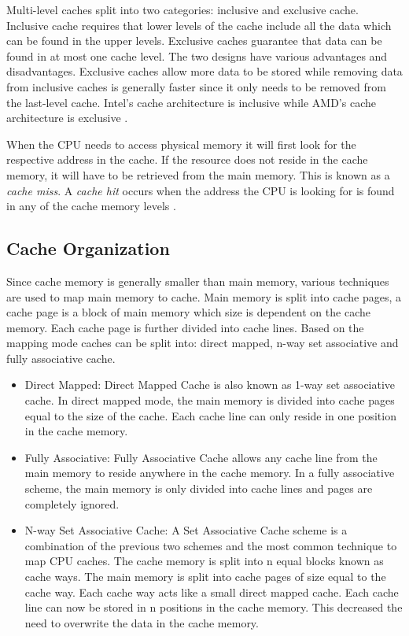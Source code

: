 \documentclass[10pt,a4paper,twoside]{book}
\begin{document}
Multi-level caches split into two categories: inclusive and exclusive cache. Inclusive cache requires that lower levels of the cache include all the data which can be found in the upper levels. Exclusive caches guarantee that data can be found in at most one cache level. The two designs have various advantages and disadvantages. Exclusive caches allow more data to be stored while removing data from inclusive caches is generally faster since it only needs to be removed from the last-level cache. Intel's cache architecture is inclusive while AMD's cache architecture is exclusive \cite{oren2015spy}.

When the CPU needs to access physical memory it will first look for the respective address in the cache. If the resource does not reside in the cache memory, it will have to be retrieved from the main memory. This is known as a \textit{cache miss}. A \textit{cache hit} occurs when the address the CPU is looking for is found in any of the cache memory levels \cite{oren2015spy}.

\subsection{Cache Organization}
Since cache memory is generally smaller than main memory, various techniques are used to map main memory to cache. Main memory is split into cache pages, a cache page is a block of main memory which size is dependent on the cache memory. Each cache page is further divided into cache lines. Based on the mapping mode caches can be split into: direct mapped, n-way set associative and fully associative cache.
\begin{itemize}
\item Direct Mapped: Direct Mapped Cache is also known as 1-way set associative cache. In direct mapped mode, the main memory is divided into cache pages equal to the size of the cache. Each cache line can only reside in one position in the cache memory. 
\item Fully Associative: Fully Associative Cache allows any cache line from the main memory to reside anywhere in the cache memory. In a fully associative scheme, the main memory is only divided into cache lines and pages are completely ignored.
\item N-way Set Associative Cache: A Set Associative Cache scheme is a combination of the previous two schemes and the most common technique to map CPU caches. The cache memory is split into n equal blocks known as cache ways. The main memory is split into cache pages of size equal to the cache way. Each cache way acts like a small direct mapped cache. Each cache line can now be stored in n positions in the cache memory. This decreased the need to overwrite the data in the cache memory.
\end{itemize}
\end{document}
